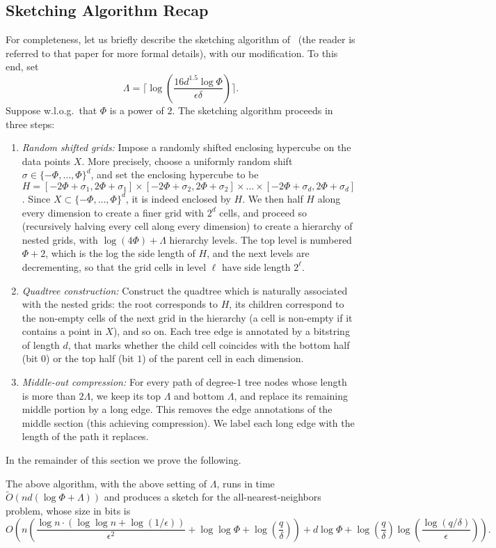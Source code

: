 \subsection{Sketching Algorithm Recap}
For completeness, let us briefly describe the sketching algorithm of~\cite{indyk2017practical} (the reader is referred to that paper for more formal details), with our modification.
To this end, set
\[ \Lambda = \lceil\log\left(\frac{16d^{1.5}\log\Phi}{\epsilon\delta}\right)\rceil . \]
Suppose w.l.o.g.~that $\Phi$ is a power of $2$. The sketching algorithm proceeds in three steps:
\begin{enumerate}
  \item\emph{Random shifted grids:} Impose a randomly shifted enclosing hypercube on the data points $X$. More precisely, choose a uniformly random shift $\sigma\in\{-\Phi,\ldots,\Phi\}^d$, and set the enclosing hypercube to be $H=[-2\Phi+\sigma_1,2\Phi+\sigma_1]\times[-2\Phi+\sigma_2,2\Phi+\sigma_2]\times\ldots\times[-2\Phi+\sigma_d,2\Phi+\sigma_d]$. Since $X\subset\{-\Phi,\ldots,\Phi\}^d$, it is indeed enclosed by $H$. We then half $H$ along every dimension to create a finer grid with $2^d$ cells, and proceed so (recursively halving every cell along every dimension) to create a hierarchy of nested grids, with $\log(4\Phi)+\Lambda$ hierarchy levels. The top level is numbered $\Phi+2$, which is the log the side length of $H$, and the next levels are decrementing, so  that the grid cells in level $\ell$ have side length $2^\ell$.
  \item\emph{Quadtree construction:} Construct the quadtree which is naturally associated with the nested grids: the root corresponds to $H$, its children correspond to the non-empty cells of the next grid in the hierarchy (a cell is non-empty if it contains a point in $X$), and so on.
Each tree edge is annotated by a bitstring of length $d$, that marks whether the child cell coincides with the bottom half (bit $0$) or the top half (bit $1$) of the parent cell in each dimension.
  \item\emph{Middle-out compression:} For every path of degree-$1$ tree nodes whose length is more than $2\Lambda$, we keep its top $\Lambda$ and bottom $\Lambda$, and replace its remaining middle portion by a long edge. This removes the edge annotations of the middle section (this achieving compression). We label each long edge with the length of the path it replaces.
\end{enumerate}

In the remainder of this section we prove the following.
\begin{theorem}\label{thm:ann_practical}
The above algorithm, with the above setting of $\Lambda$, runs in time $\tilde O(nd(\log\Phi+\Lambda))$ and produces a sketch for the all-nearest-neighbors problem, whose size in bits is
\[
  O\left( n\left(\frac{\log n\cdot(\log\log n + \log(1/\epsilon))}{\epsilon^2} + \log\log\Phi + \log\left(\frac{q}{\delta}\right)\right) + d\log\Phi  + \log\left(\frac{q}{\delta}\right)\log\left(\frac{\log(q/\delta)}{\epsilon}\right) \right).
\]
\end{theorem}

